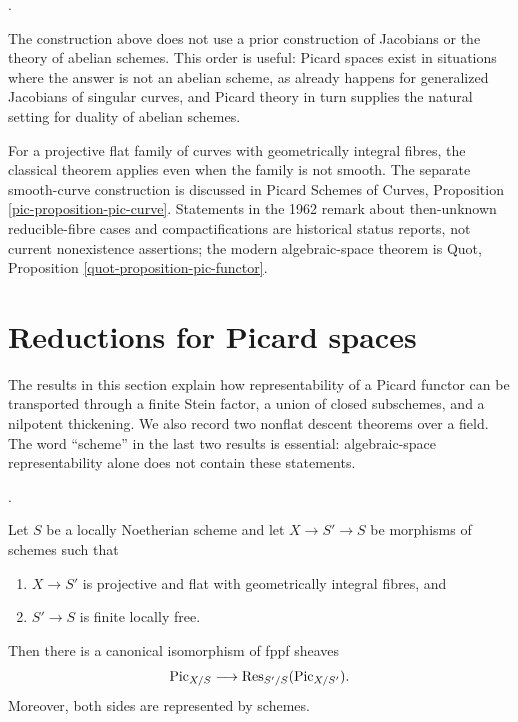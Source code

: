 \begin{remark}
\label{remark-picard-before-abelian-schemes}
\begin{reference}
\cite[Expos\'e 232, Remarks 5.3 and 5.4, pp. 156--157]{FGA}.
\end{reference}
The construction above does not use a prior construction of Jacobians or the
theory of abelian schemes. This order is useful: Picard spaces exist in
situations where the answer is not an abelian scheme, as already happens for
generalized Jacobians of singular curves, and Picard theory in turn supplies
the natural setting for duality of abelian schemes.

For a projective flat family of curves with geometrically integral fibres,
the classical theorem applies even when the family is not smooth. The
separate smooth-curve construction is discussed in Picard Schemes of Curves,
Proposition \ref{pic-proposition-pic-curve}. Statements in the 1962 remark
about then-unknown reducible-fibre cases and compactifications are historical
status reports, not current nonexistence assertions; the modern
algebraic-space theorem is Quot, Proposition
\ref{quot-proposition-pic-functor}.
\end{remark}




\section{Reductions for Picard spaces}
\label{section-reductions-picard-spaces}

\noindent
The results in this section explain how representability of a Picard functor
can be transported through a finite Stein factor, a union of closed
subschemes, and a nilpotent thickening. We also record two nonflat descent
theorems over a field. The word ``scheme'' in the last two results is
essential: algebraic-space representability alone does not contain these
statements.

\begin{proposition}
\label{proposition-picard-stein-restriction}
\begin{reference}
\cite[Expos\'e 232, Proposition 6.1 and Corollary 6.2,
pp. 157--158]{FGA}.
\end{reference}
Let $S$ be a locally Noetherian scheme and let $X \to S' \to S$ be
morphisms of schemes such that
\begin{enumerate}
\item $X \to S'$ is projective and flat with geometrically integral fibres,
and
\item $S' \to S$ is finite locally free.
\end{enumerate}
Then there is a canonical isomorphism of fppf sheaves
\begin{equation}
\label{equation-picard-stein-restriction}
\mathrm{Pic}_{X/S} \longrightarrow
\mathop{\rm Res}\nolimits_{S'/S}(\mathrm{Pic}_{X/S'}).
\end{equation}
Moreover, both sides are represented by schemes.
\end{proposition}

